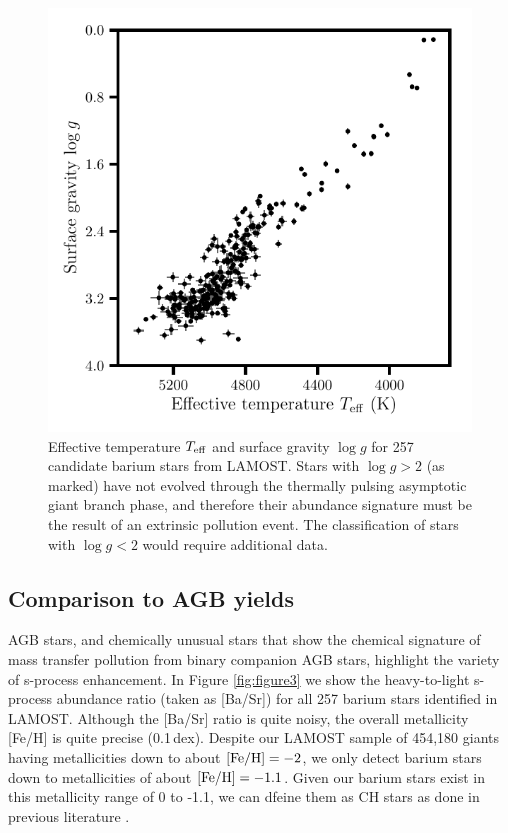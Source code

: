 \documentclass[a4paper,fleqn,usenatbib]{mnras}
\begin{document}
\begin{figure}
	\includegraphics[width=\columnwidth]{hrd_new.pdf}
    \caption{Effective temperature $T_{\rm eff}$ and surface gravity $\log{g}$ for 257 candidate barium stars from LAMOST. Stars with $\log{g} > 2$ (as marked) have not evolved through the thermally pulsing asymptotic giant branch phase, and therefore their abundance signature must be the result of an extrinsic pollution event. The classification of stars with $\log{g} < 2$ would require additional data.}
    \label{fig:figure2}
\end{figure}


\subsection{Comparison to AGB yields}
AGB stars, and chemically unusual stars that show the chemical signature of mass transfer pollution from binary companion AGB stars, highlight the variety of s-process enhancement. In Figure \ref{fig:figure3} we show the heavy-to-light s-process abundance ratio (taken as [Ba/Sr]) for all 257 barium stars identified in LAMOST. Although the [Ba/Sr] ratio is quite noisy, the overall metallicity [Fe/H] is quite precise (0.1\,dex). Despite our LAMOST sample of 454,180 giants having metallicities down to about $[{\rm Fe/H}] = -2$, we only detect barium stars down to metallicities of about $[{\rm Fe/H}] = -1.1$. Given our barium stars exist in this metallicity range of 0 to -1.1, we can dfeine them as CH stars as done in previous literature \citep[e.g.][]{luck1991, mcclure1997}.
\end{document}
